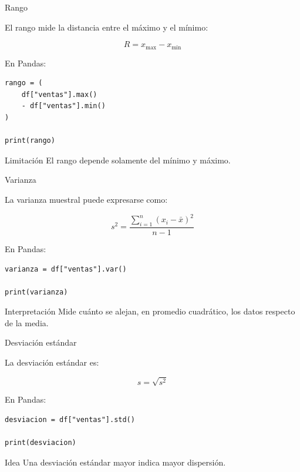 \documentclass[aspectratio=169,11pt]{beamer}
\begin{document}

\begin{frame}[fragile]{Rango}

El rango mide la distancia entre el máximo y el mínimo:

\[
R
=
x_{\max}
-
x_{\min}
\]

En Pandas:

\begin{lstlisting}
rango = (
    df["ventas"].max()
    - df["ventas"].min()
)

print(rango)
\end{lstlisting}

\begin{alertblock}{Limitación}
El rango depende solamente del mínimo y máximo.
\end{alertblock}

\end{frame}


\begin{frame}[fragile]{Varianza}

La varianza muestral puede expresarse como:

\[
s^2
=
\frac{
\sum_{i=1}^{n}
(x_i-\bar{x})^2
}{
n-1
}
\]

En Pandas:

\begin{lstlisting}
varianza = df["ventas"].var()

print(varianza)
\end{lstlisting}

\begin{block}{Interpretación}
Mide cuánto se alejan, en promedio cuadrático, los datos respecto de la media.
\end{block}

\end{frame}


\begin{frame}[fragile]{Desviación estándar}

La desviación estándar es:

\[
s
=
\sqrt{s^2}
\]

En Pandas:

\begin{lstlisting}
desviacion = df["ventas"].std()

print(desviacion)
\end{lstlisting}

\vspace{0.3cm}

\begin{block}{Idea}
Una desviación estándar mayor indica mayor dispersión.
\end{block}

\end{frame}
\end{document}
